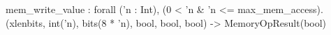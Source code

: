 mem_write_value : forall ('n : Int), (0 < 'n & 'n <= max_mem_access).
  (xlenbits, int('n), bits(8 * 'n), bool, bool, bool) -> MemoryOpResult(bool)